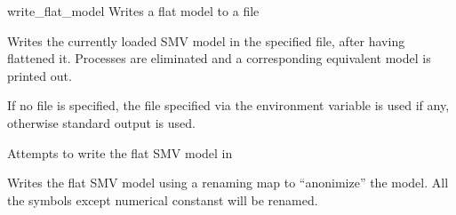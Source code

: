 \begin{nusmvCommand} {write\_flat\_model} {Writes a flat model to a file}


Writes the currently loaded SMV model in the specified file, after
having flattened it. Processes are eliminated and a
corresponding equivalent model is printed out.

If no file is specified, the file specified via the environment
variable  is used if any, otherwise
standard output is used.

\begin{cmdOpt}
 {Attempts to write the flat
SMV model in }

 {Writes the flat SMV model using a renaming map to
  ``anonimize'' the model. All the symbols except numerical constanst
  will be renamed.}
\end{cmdOpt}



\end{nusmvCommand}
